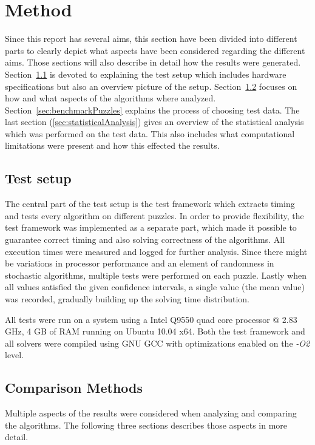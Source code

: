 \documentclass[a4paper,11pt]{kth-mag}
\begin{document}
\chapter{Method}
Since this report has several aims, this section have been divided into different parts to clearly depict what aspects have been considered regarding the different aims. 
Those sections will also describe in detail how the results were generated. 
Section~\ref{sec:testSetupMethod} is devoted to explaining the test setup which includes hardware specifications but also an overview picture of the setup. 
Section~\ref{sec:comparisonMethod} focuses on how and what aspects of the algorithms where analyzed.
Section~\ref{sec:benchmarkPuzzles} explains the process of choosing test data.
The last section (\ref{sec:statisticalAnalysis}) gives an overview of the statistical analysis which was performed on the test data.
This also includes what computational limitations were present and how this effected the results. 

\FloatBarrier
\section{Test setup}
\label{sec:testSetupMethod}
The central part of the test setup is the test framework which extracts timing and tests every algorithm on different puzzles. 
In order to provide flexibility, the test framework was implemented as a separate part, which made it possible to guarantee correct timing and also solving correctness of the algorithms.
All execution times were measured and logged for further analysis.
Since there might be variations in processor performance and an element of randomness in stochastic algorithms, multiple tests were performed on each puzzle. 
Lastly when all values satisfied the given confidence intervals, a single value (the mean value) was recorded, gradually building up the solving time distribution.

All tests were run on a system using a Intel Q9550 quad core processor @ 2.83 GHz, 4 GB of RAM running on Ubuntu 10.04 x64.
Both the test framework and all solvers were compiled using GNU GCC with optimizations enabled on the \emph{-O2} level.

\FloatBarrier
\section{Comparison Methods}
\label{sec:comparisonMethod}
Multiple aspects of the results were considered when analyzing and comparing the algorithms. The following three sections describes those aspects in more detail. 
\end{document}
